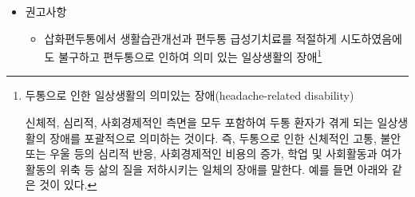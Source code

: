 \documentclass[]{book}
\providecommand{\tightlist}{%
  \setlength{\itemsep}{0pt}\setlength{\parskip}{0pt}}
\let\rmarkdownfootnote\footnote%
\def\footnote{\protect\rmarkdownfootnote}
\begin{document}
\begin{itemize}
\item
  권고사항

  \begin{itemize}
  \tightlist
  \item
    삽화편두통에서 생활습관개선과 편두통 급성기치료를 적절하게 시도하였음에도 불구하고 편두통으로 인하여 의미 있는 일상생활의 장애\footnote{두통으로 인한 일상생활의 의미있는 장애(headache-related disability)

      신체적, 심리적, 사회경제적인 측면을 모두 포함하여 두통 환자가 겪게 되는 일상생활의 장애를 포괄적으로 의미하는 것이다. 즉, 두통으로 인한 신체적인 고통, 불안 또는 우울 등의 심리적 반응, 사회경제적인 비용의 증가, 학업 및 사회활동과 여가활동의 위축 등 삶의 질을 저하시키는 일체의 장애를 말한다. 예를 들면 아래와 같은 것이 있다.

}
\end{itemize}
\end{itemize}
\end{document}
